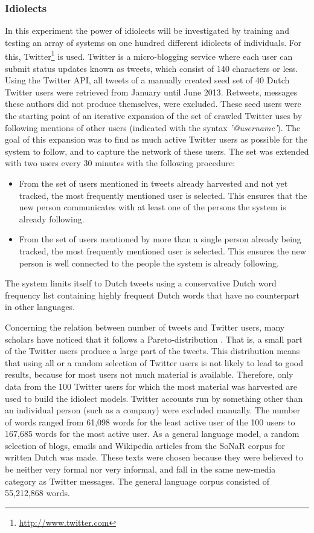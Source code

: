 \documentclass[12pt]{article}
\begin{document}
\subsubsection{Idiolects} \label{idiolects}

In this experiment the power of idiolects will be investigated by training and testing an array of systems on one hundred different idiolects of individuals. For this, Twitter\footnote{\url{http://www.twitter.com}} is used. Twitter is a micro-blogging service where each user can submit status updates known as tweets, which consist of 140 characters or less. Using the Twitter API, all tweets of a manually created seed set of 40 Dutch Twitter users were retrieved from January until June 2013. Retweets, messages these authors did not produce themselves, were excluded. These seed users were the starting point of an iterative expansion of the set of crawled Twitter uses by following mentions of other users (indicated with the syntax \emph{'@username'}). The goal of this expansion was to find as much active Twitter users as possible for the system to follow, and to capture the network of these users. The set was extended with two users every 30 minutes with the following procedure:

\begin{itemize}
\item From the set of users mentioned in tweets already harvested and not yet tracked, the most frequently mentioned user is selected. This ensures that the new person communicates with at least one of the persons the system is already following.
\item From the set of users mentioned by more than a single person already being tracked, the most frequently mentioned user is selected. This ensures the new person is well connected to the people the system is already following.
\end{itemize}

The system limits itself to Dutch tweets using a conservative Dutch word frequency list containing highly frequent Dutch words that have no counterpart in other languages.

Concerning the relation between number of tweets and Twitter users, many scholars have noticed that it follows a Pareto-distribution \cite{heil+09,asur+10,rui+12}. That is, a small part of the Twitter users produce a large part of the tweets. 
This distribution means that using all or a random selection of Twitter users is not likely to lead to good results, because for most users not much material is available. Therefore, only data from the 100 Twitter users for which the most material was harvested are used to build the idiolect models. Twitter accounts run by something other than an individual person (such as a company) were excluded manually. The number of words ranged from 61,098 words for the least active user of the 100 users to 167,685 words for the most active user. As a general language model, a random selection of blogs, emails and Wikipedia articles from the SoNaR corpus for written Dutch \cite{oostdijk+13} was made. These texts were chosen because they were believed to be neither very formal nor very informal, and fall in the same new-media category as Twitter messages. The general language corpus consisted of 55,212,868 words.
\end{document}
